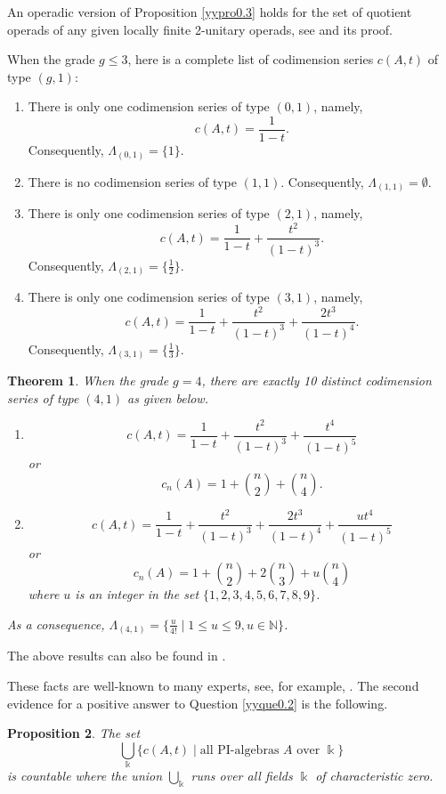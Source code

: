 \documentclass{amsart}
\newtheorem{thm}{Theorem}[section]
\newtheorem{prop}[thm]{Proposition}
\theoremstyle{definition}
\theoremstyle{remark}
\numberwithin{equation}{section}
\def\N{\mathbb{N}}
\def \N{\mathbb{N}}
\begin{document}
An operadic version of Proposition \ref{yypro0.3} holds 
for the set of quotient operads of any given locally finite 2-unitary operads, 
see \cite[Theorem 5.3]{BYZ} and its proof. 

When the grade $g\leq 3$, here is a complete list of codimension series $c(A,t)$ of type $(g,1)$:
\begin{enumerate}
\item[(1)]
There is only one codimension series of type $(0,1)$, namely,
$$c(A,t)=\frac{1}{1-t}.$$
Consequently, $\Lambda_{(0,1)}=\{1\}$.
\item[(2)]
There is no codimension series of type $(1,1)$. 
Consequently, $\Lambda_{(1,1)}=\emptyset$.
\item[(3)]
There is only one codimension series of type $(2,1)$, namely,
$$c(A,t)=\frac{1}{1-t}+\frac{t^2}{(1-t)^3}.$$
Consequently, $\Lambda_{(2,1)}=\{\frac{1}{2}\}$.
\item[(4)]
There is only one codimension series of type $(3,1)$, namely,
$$c(A,t)=\frac{1}{1-t}+\frac{t^2}{(1-t)^3}+\frac{2t^3}{(1-t)^4}.$$
Consequently, $\Lambda_{(3,1)}=\{\frac{1}{3}\}$.
\end{enumerate}



\begin{thm}
\label{yythm0.4} 
When the grade $g=4$, there are exactly 10 distinct codimension 
series of type $(4,1)$ as given below.
\begin{enumerate}
\item[(a)]
$$c(A,t)=\frac{1}{1-t}+\frac{t^2}{(1-t)^3}+
\frac{t^4}{(1-t)^5}$$
or
\[c_n(A)=1+{n\choose 2}+{n\choose 4}.\]
\item[(b)]
$$c(A,t)=\frac{1}{1-t}+\frac{t^2}{(1-t)^3}+
\frac{2t^3}{(1-t)^4}+\frac{ut^4}{(1-t)^5}$$
or
\[c_n(A)=1+{n\choose 2}+2{n\choose 3}+u{n\choose 4}\]
where $u$ is an integer in the set $\{1,2,3,4,5,6,7,8,9\}$.
\end{enumerate}
As a consequence, 
$\Lambda_{(4,1)}=\{\frac{u}{4!}\mid 1\leq u\leq 9, u\in \N\}$.
\end{thm}

The above results can also be found in \cite[Section 5]{OV}.

These facts are well-known to many experts, see, for example, 
\cite{BYZ, DrR, GMP, GMZ, Ma, OV}. 
The second evidence for a 
positive answer to Question \ref{yyque0.2} is the following.

\begin{prop}
\label{xxpro0.5}
The set
$$\bigcup_{\Bbbk} \{ c(A,t)\mid {\text{all PI-algebras $A$ 
over $\Bbbk$}}\}
$$
is countable where the union $\bigcup_{\Bbbk}$ runs over 
all fields $\Bbbk$ of characteristic zero.
\end{prop}
\end{document}
